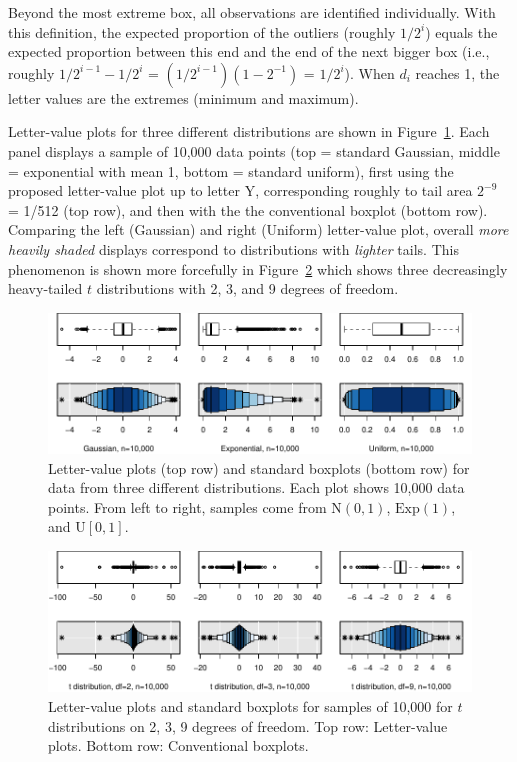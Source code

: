 \documentclass[12pt,oneside]{article}
\begin{document}
Beyond the most extreme box, all observations are identified individually. With this definition, the expected proportion of the outliers (roughly $1/2^i$) equals the expected proportion between this end and the end of the next bigger box (i.e., roughly $1/2^{i-1} - 1/2^i$ = $(1/2^{i-1})(1 - 2^{-1})$ = $1 / 2^i$). When $d_i$ reaches 1, the letter values are the extremes (minimum and maximum).

Letter-value plots for three different distributions are shown in Figure~\ref{stackbox}. Each panel displays a sample of 10,000 data points (top = standard Gaussian, middle = exponential with mean 1, bottom = standard uniform), first using the proposed letter-value plot up to letter Y, corresponding roughly to tail area $2^{-9}$ = 1/512 (top row), and then with the the conventional boxplot (bottom row). Comparing the left (Gaussian) and right (Uniform) letter-value plot, overall \textit{more heavily shaded} displays correspond to distributions with \textit{lighter} tails. This phenomenon is shown more forcefully in Figure~\ref{t-dist} which shows three decreasingly heavy-tailed $t$ distributions with 2, 3, and 9 degrees of freedom.

\begin{figure}[hbtp]
  \centering
  \includegraphics[width = \linewidth]{boxplots}

  \caption{Letter-value plots (top row) and standard boxplots (bottom row) for
  data from three different distributions. Each plot shows 10,000 data points.
  From left to right, samples come from $\mbox{N}(0,1)$, $\mbox{Exp}(1)$, and
  $\mbox{U}[0,1]$. }

  \label{stackbox}
\end{figure}

\begin{figure}[hbtp]
  \centering
  \includegraphics[width = \linewidth]{t-dist}
  
  \caption{Letter-value plots and standard boxplots for samples of 10,000
  for $t$ distributions on 2, 3, 9 degrees of freedom. Top row: Letter-value
  plots. Bottom row: Conventional boxplots.}
  \label{t-dist}
\end{figure}
\end{document}
